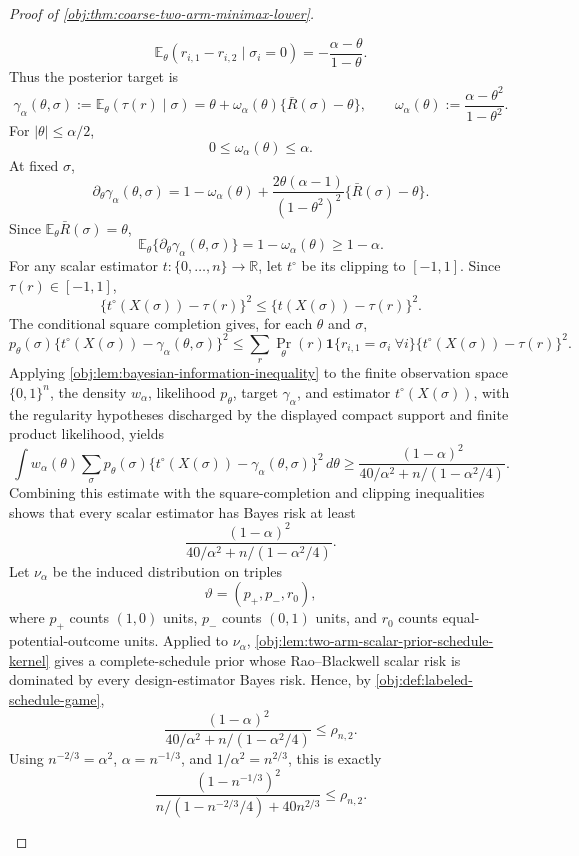 \begin{proof}[Proof of \cref{obj:thm:coarse-two-arm-minimax-lower}]
\begin{enumerate}
\[
\mathbb E_\theta(r_{i,1}-r_{i,2}\mid \sigma_i=0)=-\frac{\alpha-\theta}{1-\theta}.
\]
Thus the posterior target is
\[
\gamma_\alpha(\theta,\sigma)
:=
\mathbb E_\theta(\tau(r)\mid \sigma)
=
\theta+\omega_\alpha(\theta)\{\bar R(\sigma)-\theta\},
\qquad
\omega_\alpha(\theta):=\frac{\alpha-\theta^2}{1-\theta^2}.
\]
For \(|\theta|\le\alpha/2\),
\[
0\le \omega_\alpha(\theta)\le \alpha.
\]
At fixed \(\sigma\),
\[
\partial_\theta\gamma_\alpha(\theta,\sigma)
=
1-\omega_\alpha(\theta)
+
\frac{2\theta(\alpha-1)}{(1-\theta^2)^2}
\{\bar R(\sigma)-\theta\}.
\]
Since \(\mathbb E_\theta\bar R(\sigma)=\theta\),
\[
\mathbb E_\theta\{\partial_\theta\gamma_\alpha(\theta,\sigma)\}
=
1-\omega_\alpha(\theta)
\ge
1-\alpha.
\]
For any scalar estimator \(t:\{0,\ldots,n\}\to\mathbb R\), let \(t^\circ\) be its clipping to \([-1,1]\). Since \(\tau(r)\in[-1,1]\),
\[
\{t^\circ(X(\sigma))-\tau(r)\}^2
\le
\{t(X(\sigma))-\tau(r)\}^2.
\]
The conditional square completion gives, for each \(\theta\) and \(\sigma\),
\[
p_\theta(\sigma)\{t^\circ(X(\sigma))-\gamma_\alpha(\theta,\sigma)\}^2
\le
\sum_r
\Pr_\theta(r)\mathbf 1\{r_{i,1}=\sigma_i\ \forall i\}
\{t^\circ(X(\sigma))-\tau(r)\}^2 .
\]
Applying \cref{obj:lem:bayesian-information-inequality} to the finite observation space \(\{0,1\}^n\), the density \(w_\alpha\), likelihood \(p_\theta\), target \(\gamma_\alpha\), and estimator \(t^\circ(X(\sigma))\), with the regularity hypotheses discharged by the displayed compact support and finite product likelihood, yields
\[
\int w_\alpha(\theta)
\sum_\sigma
p_\theta(\sigma)
\{t^\circ(X(\sigma))-\gamma_\alpha(\theta,\sigma)\}^2\,d\theta
\ge
\frac{(1-\alpha)^2}
{40/\alpha^2+n/(1-\alpha^2/4)}.
\]
Combining this estimate with the square-completion and clipping inequalities shows that every scalar estimator has Bayes risk at least
\[
\frac{(1-\alpha)^2}
{40/\alpha^2+n/(1-\alpha^2/4)}.
\]
Let \(\nu_\alpha\) be the induced distribution on triples
\[
\vartheta=(p_+,p_-,r_0),
\]
where \(p_+\) counts \((1,0)\) units, \(p_-\) counts \((0,1)\) units, and \(r_0\) counts equal-potential-outcome units. Applied to \(\nu_\alpha\), \cref{obj:lem:two-arm-scalar-prior-schedule-kernel} gives a complete-schedule prior whose Rao--Blackwell scalar risk is dominated by every design-estimator Bayes risk. Hence, by \cref{obj:def:labeled-schedule-game},
\[
\frac{(1-\alpha)^2}
{40/\alpha^2+n/(1-\alpha^2/4)}
\le
\rho_{n,2}.
\]
Using \(n^{-2/3}=\alpha^2\), \(\alpha=n^{-1/3}\), and \(1/\alpha^2=n^{2/3}\), this is exactly
\[
\frac{(1-n^{-1/3})^2}
{n/(1-n^{-2/3}/4)+40n^{2/3}}
\le
\rho_{n,2}.
\]


\end{enumerate}
\end{proof}
